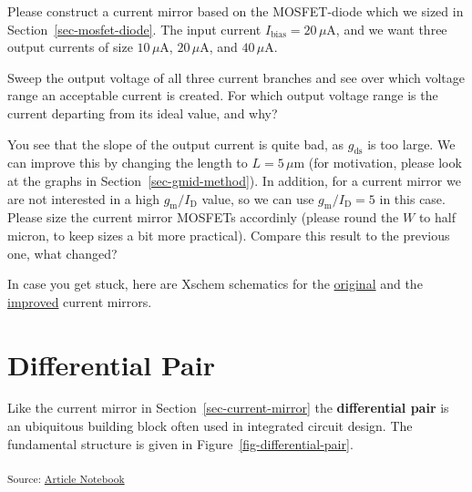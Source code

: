 \documentclass[
  a4paper,
  DIV=11,
  numbers=noendperiod]{scrartcl}
\begin{document}
\begin{tcolorbox}[enhanced jigsaw, breakable, title=\textcolor{quarto-callout-tip-color}{\faLightbulb}\hspace{0.5em}{Exercise: Current Mirror}, left=2mm, bottomrule=.15mm, opacitybacktitle=0.6, opacityback=0, colframe=quarto-callout-tip-color-frame, leftrule=.75mm, bottomtitle=1mm, colbacktitle=quarto-callout-tip-color!10!white, toprule=.15mm, rightrule=.15mm, toptitle=1mm, titlerule=0mm, arc=.35mm, colback=white, coltitle=black]

Please construct a current mirror based on the MOSFET-diode which we
sized in Section~\ref{sec-mosfet-diode}. The input current
\(I_\mathrm{bias} = 20\,\mu\text{A}\), and we want three output currents
of size \(10\,\mu\text{A}\), \(20\,\mu\text{A}\), and
\(40\,\mu\text{A}\).

Sweep the output voltage of all three current branches and see over
which voltage range an acceptable current is created. For which output
voltage range is the current departing from its ideal value, and why?

You see that the slope of the output current is quite bad, as
\(g_\mathrm{ds}\) is too large. We can improve this by changing the
length to \(L = 5\,\mu\text{m}\) (for motivation, please look at the
graphs in Section~\ref{sec-gmid-method}). In addition, for a current
mirror we are not interested in a high \(g_\mathrm{m}/I_\mathrm{D}\)
value, so we can use \(g_\mathrm{m}/I_\mathrm{D}= 5\) in this case.
Please size the current mirror MOSFETs accordinly (please round the
\(W\) to half micron, to keep sizes a bit more practical). Compare this
result to the previous one, what changed?

In case you get stuck, here are Xschem schematics for the
\href{./xschem/current_mirror.sch}{original} and the
\href{./xschem/current_mirror_improved.sch}{improved} current mirrors.

\end{tcolorbox}

\section{Differential Pair}\label{sec-diff-pair}

Like the current mirror in Section~\ref{sec-current-mirror} the
\textbf{differential pair} is an ubiquitous building block often used in
integrated circuit design. The fundamental structure is given in
Figure~\ref{fig-differential-pair}.

\textsubscript{Source:
\href{https://iic-jku.github.io/analog-circuit-design/index.qmd.html}{Article
Notebook}}
\end{document}
